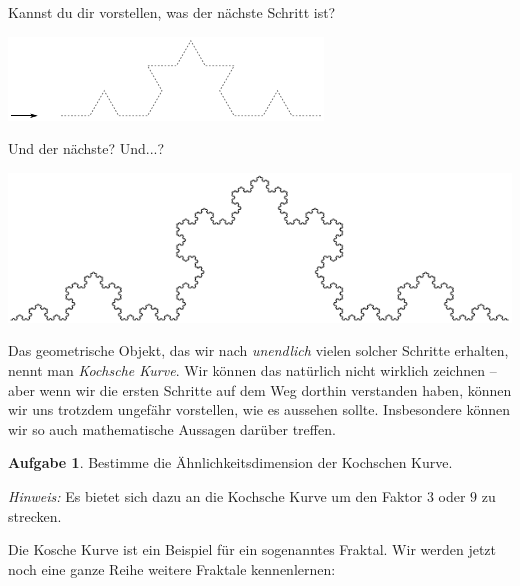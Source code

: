\documentclass[a4paper,ngerman,12pt]{scrartcl}
\theoremstyle{definition}
\newtheorem{aufg}{Aufgabe}
\theoremstyle{plain}
\theoremstyle{remark}
\begin{document}
Kannst du dir vorstellen, was der nächste Schritt ist?

\begin{center}
	\includegraphics[width=.7\textwidth]{Bilder/Schneeflocke-Konstruktion2.pdf}
\end{center}

Und der nächste? Und...?

\begin{center}
	\includegraphics[width=.5\textwidth]{Bilder/Schneeflocke-Konstruktion3.pdf}
\end{center}

Das geometrische Objekt, das wir nach \emph{unendlich} vielen solcher Schritte erhalten, nennt man \emph{Kochsche Kurve}. Wir können das natürlich nicht wirklich zeichnen -- aber wenn wir die ersten Schritte auf dem Weg dorthin verstanden haben, können wir uns trotzdem ungefähr vorstellen, wie es aussehen sollte. Insbesondere können wir so auch mathematische Aussagen darüber treffen.

\begin{aufg}
	Bestimme die Ähnlichkeitsdimension der Kochschen Kurve. 
	
	\textit{Hinweis:} Es bietet sich dazu an die Kochsche Kurve um den Faktor $3$ oder $9$ zu strecken.
\end{aufg}

Die Kosche Kurve ist ein Beispiel für ein sogenanntes Fraktal. Wir werden jetzt noch eine ganze Reihe weitere Fraktale kennenlernen:
\end{document}
